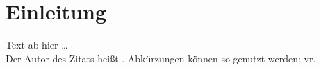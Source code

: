 \section{Einleitung}\label{ch:Einleitung}
Text ab hier \ldots \\
Der Autor des Zitats \cite{Papula2006} heißt \citeauthor{Papula2006}.
Abkürzungen können so genutzt werden: \gls{vr}.

